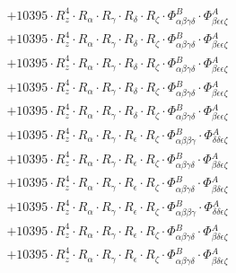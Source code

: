 \documentclass{article}
\begin{document}
\begin{subequations}
\begin{gather}
\begin{array}{c}
 \\[0.2em] 		 + 10395 \cdot R_{z}^{4} \cdot R_{\alpha{}} \cdot R_{\gamma{}} \cdot R_{\delta{}} \cdot R_{\zeta{}} \cdot \Phi{}^{B}_{\alpha{}\beta{}\gamma{}\delta{}} \cdot \Phi{}^{A}_{\beta{}\epsilon{}\epsilon{}\zeta{}} 
 \\[0.2em] 		 + 10395 \cdot R_{z}^{4} \cdot R_{\alpha{}} \cdot R_{\gamma{}} \cdot R_{\delta{}} \cdot R_{\zeta{}} \cdot \Phi{}^{B}_{\alpha{}\beta{}\gamma{}\delta{}} \cdot \Phi{}^{A}_{\beta{}\epsilon{}\epsilon{}\zeta{}} 
 \\[0.2em] 		 + 10395 \cdot R_{z}^{4} \cdot R_{\alpha{}} \cdot R_{\gamma{}} \cdot R_{\delta{}} \cdot R_{\zeta{}} \cdot \Phi{}^{B}_{\alpha{}\beta{}\gamma{}\delta{}} \cdot \Phi{}^{A}_{\beta{}\epsilon{}\epsilon{}\zeta{}} 
 \\[0.2em] 		 + 10395 \cdot R_{z}^{4} \cdot R_{\alpha{}} \cdot R_{\gamma{}} \cdot R_{\delta{}} \cdot R_{\zeta{}} \cdot \Phi{}^{B}_{\alpha{}\beta{}\gamma{}\delta{}} \cdot \Phi{}^{A}_{\beta{}\epsilon{}\epsilon{}\zeta{}} 
 \\[0.2em] 		 + 10395 \cdot R_{z}^{4} \cdot R_{\alpha{}} \cdot R_{\gamma{}} \cdot R_{\delta{}} \cdot R_{\zeta{}} \cdot \Phi{}^{B}_{\alpha{}\beta{}\gamma{}\delta{}} \cdot \Phi{}^{A}_{\beta{}\epsilon{}\epsilon{}\zeta{}} 
 \\[0.2em] 		 + 10395 \cdot R_{z}^{4} \cdot R_{\alpha{}} \cdot R_{\gamma{}} \cdot R_{\epsilon{}} \cdot R_{\zeta{}} \cdot \Phi{}^{B}_{\alpha{}\beta{}\beta{}\gamma{}} \cdot \Phi{}^{A}_{\delta{}\delta{}\epsilon{}\zeta{}} 
 \\[0.2em] 		 + 10395 \cdot R_{z}^{4} \cdot R_{\alpha{}} \cdot R_{\gamma{}} \cdot R_{\epsilon{}} \cdot R_{\zeta{}} \cdot \Phi{}^{B}_{\alpha{}\beta{}\gamma{}\delta{}} \cdot \Phi{}^{A}_{\beta{}\delta{}\epsilon{}\zeta{}} 
 \\[0.2em] 		 + 10395 \cdot R_{z}^{4} \cdot R_{\alpha{}} \cdot R_{\gamma{}} \cdot R_{\epsilon{}} \cdot R_{\zeta{}} \cdot \Phi{}^{B}_{\alpha{}\beta{}\gamma{}\delta{}} \cdot \Phi{}^{A}_{\beta{}\delta{}\epsilon{}\zeta{}} 
 \\[0.2em] 		 + 10395 \cdot R_{z}^{4} \cdot R_{\alpha{}} \cdot R_{\gamma{}} \cdot R_{\epsilon{}} \cdot R_{\zeta{}} \cdot \Phi{}^{B}_{\alpha{}\beta{}\beta{}\gamma{}} \cdot \Phi{}^{A}_{\delta{}\delta{}\epsilon{}\zeta{}} 
 \\[0.2em] 		 + 10395 \cdot R_{z}^{4} \cdot R_{\alpha{}} \cdot R_{\gamma{}} \cdot R_{\epsilon{}} \cdot R_{\zeta{}} \cdot \Phi{}^{B}_{\alpha{}\beta{}\gamma{}\delta{}} \cdot \Phi{}^{A}_{\beta{}\delta{}\epsilon{}\zeta{}} 
 \\[0.2em] 		 + 10395 \cdot R_{z}^{4} \cdot R_{\alpha{}} \cdot R_{\gamma{}} \cdot R_{\epsilon{}} \cdot R_{\zeta{}} \cdot \Phi{}^{B}_{\alpha{}\beta{}\gamma{}\delta{}} \cdot \Phi{}^{A}_{\beta{}\delta{}\epsilon{}\zeta{}} 

\end{array}
\end{gather}
\end{subequations}
\end{document}
